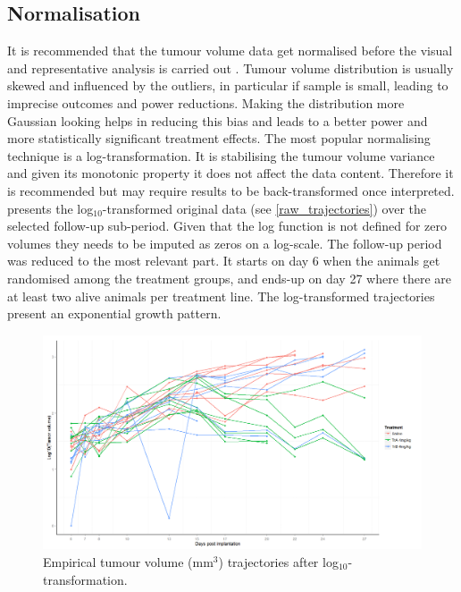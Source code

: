 \subsection{Normalisation}
It is recommended that the tumour volume data get normalised before the visual and representative analysis is carried out \autocite{Heitjan:1993uw,Demidenko:2010gn}.
Tumour volume distribution is usually skewed and influenced by the outliers, in particular if sample is small, leading to imprecise outcomes and power reductions.
Making the distribution more Gaussian looking helps in reducing this bias and leads to a better power and more statistically significant treatment effects.
The most popular normalising technique is a log-transformation.
It is stabilising the tumour volume variance and given its monotonic property it does not affect the data content.
Therefore it is recommended but may require results to be back-transformed once interpreted.
 presents the log$_{10}$-transformed original data (see \cref{raw_trajectories}) over the selected follow-up sub-period.
Given that the log function is not defined for zero volumes they needs to be imputed as zeros on a log-scale.
The follow-up period was reduced to the most relevant part.
It starts on day 6 when the animals get randomised among the treatment groups, and ends-up on day 27 where there are at least two alive animals per treatment line.
The log-transformed trajectories present an exponential growth pattern.


\begin{figure}
	\centering
	\includegraphics[width=\textwidth]{xenograph/figures/raw_trajectories_log_reduced_follow-up.png}
	\caption{Empirical tumour volume (mm$^3$) trajectories after log$_{10}$-transformation.}
	\label{raw_trajectories_log_reduced_follow-up}
\end{figure}

